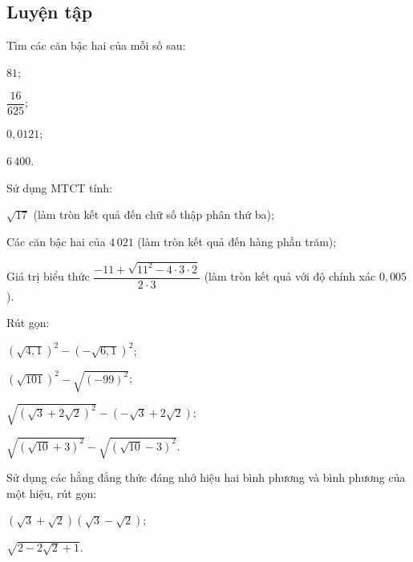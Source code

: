 \begin{practice}
    \subsection{Luyện tập}

    \begin{questions}[series=SBT]
        \item Tìm các căn bậc hai của mỗi số sau:
        \begin{questions}
            \item $81$;
            \item $\dfrac{16}{625}$;
            \item $0{,}0121$;
            \item $6\,400$.
        \end{questions}

        \answerline

        \item Sử dụng MTCT tính:
        \begin{questions}
            \item $\sqrt{17}$ (làm tròn kết quả đến chữ số thập phân thứ ba);
            \item Các căn bậc hai của $4\,021$ (làm tròn kết quả đến hàng phần trăm);
            \item Giá trị biểu thức $\dfrac{-11+\sqrt{11^2-4\cdot3\cdot2}}{2\cdot3}$ (làm tròn kết quả với độ chính xác $0{,}005$).
        \end{questions}

        \answerline
        \answerline

        \item Rút gọn:
        \begin{questions}
            \item $(\sqrt{4{,}1})^2-(-\sqrt{6{,}1})^2$;
            \item $(\sqrt{101})^2-\sqrt{(-99)^2}$;
            \item $\sqrt{(\sqrt{3}+2\sqrt{2})^2}-(-\sqrt{3}+2\sqrt{2})$;
            \item $\sqrt{(\sqrt{10}+3)^2}-\sqrt{(\sqrt{10}-3)^2}$.
        \end{questions}

        \answerline
        \answerline

        \item Sử dụng các hằng đẳng thức đáng nhớ hiệu hai bình phương và bình phương của một hiệu, rút gọn:
        \begin{questions}
            \item $(\sqrt{3}+\sqrt{2})(\sqrt{3}-\sqrt{2})$;
            \item $\sqrt{2-2\sqrt{2}+1}$.
        \end{questions}


\end{questions}
\end{practice}
